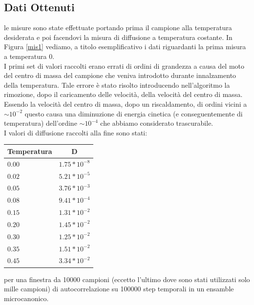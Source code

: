\documentclass[a4paper,11pt]{article}
\begin{document}
		\subsection{Dati Ottenuti} %
		\label{sub:dati_ottenuti_2}
			le misure sono state effettuate portando prima il campione alla temperatura desiderata e poi facendovi la misura di diffusione a temperatura costante. In
			Figura \ref{mis1} vediamo, a titolo esemplificativo i dati riguardanti la prima misura a temperatura 0.\\
			I primi set di valori raccolti erano errati di ordini di grandezza a causa del moto del centro di massa del campione che veniva introdotto durante innalzamento della temperatura. Tale errore è stato risolto introducendo nell'algoritmo la rimozione, dopo il caricamento delle velocità, della velocità del centro di massa.
			Essendo la velocità del centro di massa, dopo un riscaldamento, di ordini vicini a $\sim 10^{-2}$ questo causa una diminuzione di energia cinetica (e conseguentemente di temperatura) dell'ordine $\sim 10^{-4}$ che abbiamo considerato trascurabile.\\
			I valori di diffusione raccolti alla fine sono stati:
			\begin{table}[H]
				\centering
			
				\begin{tabular}{l|c}
				\hline
			
				\hline
				\textbf{Temperatura} & \textbf{D} \\
				\hline
					$0.00$ &	$1.75*10^{-8}$\\
					$0.02$ &	$5.21*10^{-5}$\\
					$0.05$ &	$3.76*10^{-3}$\\
					$0.08$ &	$9.41*10^{-4}$\\
					$0.15$ &	$1.31*10^{-2}$\\
					$0.20$ &	$1.45*10^{-2}$\\
					$0.30$ &	$1.25*10^{-2}$\\
					$0.35$ &	$1.51*10^{-2}$\\
					$0.45$ &	$3.34*10^{-2}$\\
				\hline
			
				\hline
				\end{tabular}
			\end{table}
			per una finestra da 10000 campioni (eccetto l'ultimo dove sono stati utilizzati solo mille campioni) di autocorrelazione su 100000 step temporali in un ensamble microcanonico.
\end{document}
